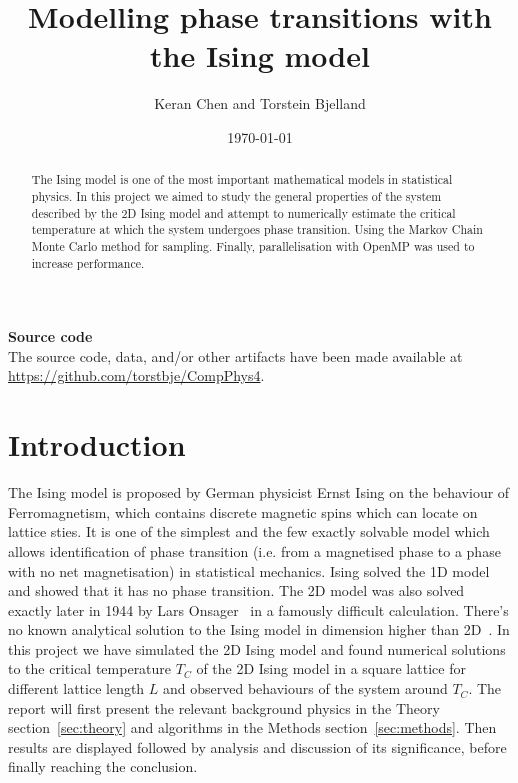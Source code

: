 \documentclass[english,notitlepage,reprint,nofootinbib]{revtex4-1}  %
\begin{document}
\title{Modelling phase transitions with the Ising model}  %
\author{Keran Chen and Torstein Bjelland} %
\date{\today}                             %
\noaffiliation                            %


\begin{abstract}
	The Ising model is one of the most important mathematical models in statistical physics. In this project we aimed to study the general properties of the system described by the 2D Ising model and attempt to numerically estimate the critical temperature at which the system undergoes phase transition. Using the Markov Chain Monte Carlo method for sampling. Finally, parallelisation with OpenMP was used to increase performance.
\end{abstract}
\maketitle

\begingroup\small\noindent\raggedright\textbf{Source code}\\
The source code, data, and/or other artifacts have been made available at \url{https://github.com/torstbje/CompPhys4}.
\endgroup

\section{Introduction}
The Ising model is proposed by German physicist Ernst Ising on the behaviour of Ferromagnetism, which contains discrete magnetic spins which can locate on lattice sties. It is one of the simplest and the few exactly solvable model which allows identification of phase transition (i.e. from a magnetised phase to a phase with no net magnetisation) in statistical mechanics. Ising solved the 1D model and showed that it has no phase transition. The 2D model was also solved exactly later in 1944 by Lars Onsager~\cite{Onsager1944} in a famously difficult calculation. There's no known analytical solution to the Ising model in dimension higher than 2D~\cite{Berlinsky2019}. 
In this project we have simulated the 2D Ising model and found numerical solutions to the critical temperature $ T_C $ of the 2D Ising model in a square lattice for different lattice length $ L $ and observed behaviours of the system around $ T_C $.
The report will first present the relevant background physics in the Theory section~\ref{sec:theory} and algorithms in the Methods section~\ref{sec:methods}. Then results are displayed followed by analysis and discussion of its significance, before finally reaching the conclusion.
%
\end{document}
